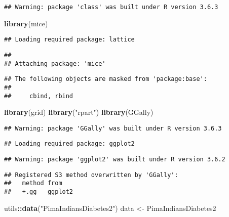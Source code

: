 \documentclass[
]{article}
\newenvironment{Shaded}{\begin{snugshade}}{\end{snugshade}}
\newcommand{\KeywordTok}[1]{\textcolor[rgb]{0.13,0.29,0.53}{\textbf{#1}}}
\newcommand{\NormalTok}[1]{#1}
\newcommand{\OperatorTok}[1]{\textcolor[rgb]{0.81,0.36,0.00}{\textbf{#1}}}
\newcommand{\StringTok}[1]{\textcolor[rgb]{0.31,0.60,0.02}{#1}}
\begin{document}
\begin{verbatim}
## Warning: package 'class' was built under R version 3.6.3
\end{verbatim}

\begin{Shaded}
\begin{Highlighting}[]
\KeywordTok{library}\NormalTok{(mice)}
\end{Highlighting}
\end{Shaded}

\begin{verbatim}
## Loading required package: lattice
\end{verbatim}

\begin{verbatim}
## 
## Attaching package: 'mice'
\end{verbatim}

\begin{verbatim}
## The following objects are masked from 'package:base':
## 
##     cbind, rbind
\end{verbatim}

\begin{Shaded}
\begin{Highlighting}[]
\KeywordTok{library}\NormalTok{(grid)}
\KeywordTok{library}\NormalTok{(}\StringTok{"rpart"}\NormalTok{)}
\KeywordTok{library}\NormalTok{(GGally)}
\end{Highlighting}
\end{Shaded}

\begin{verbatim}
## Warning: package 'GGally' was built under R version 3.6.3
\end{verbatim}

\begin{verbatim}
## Loading required package: ggplot2
\end{verbatim}

\begin{verbatim}
## Warning: package 'ggplot2' was built under R version 3.6.2
\end{verbatim}

\begin{verbatim}
## Registered S3 method overwritten by 'GGally':
##   method from   
##   +.gg   ggplot2
\end{verbatim}

\begin{Shaded}
\begin{Highlighting}[]
\NormalTok{utils}\OperatorTok{::}\KeywordTok{data}\NormalTok{(}\StringTok{"PimaIndiansDiabetes2"}\NormalTok{)}
\NormalTok{data <-}\StringTok{ }\NormalTok{PimaIndiansDiabetes2}
\end{Highlighting}
\end{Shaded}
\end{document}
